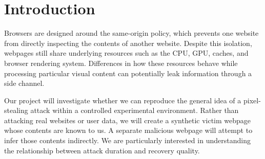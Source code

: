 \section{Introduction}
\label{sec:introduction}

Browsers are designed around the same-origin policy, which prevents one website from directly inspecting the contents of another website. Despite this isolation, webpages still share underlying resources such as the CPU, GPU, caches, and browser rendering system. Differences in how these resources behave while processing particular visual content can potentially leak information through a side channel.

Our project will investigate whether we can reproduce the general idea of a pixel-stealing attack within a controlled experimental environment. Rather than attacking real websites or user data, we will create a synthetic victim webpage whose contents are known to us. A separate malicious webpage will attempt to infer those contents indirectly. We are particularly interested in understanding the relationship between attack duration and recovery quality.
